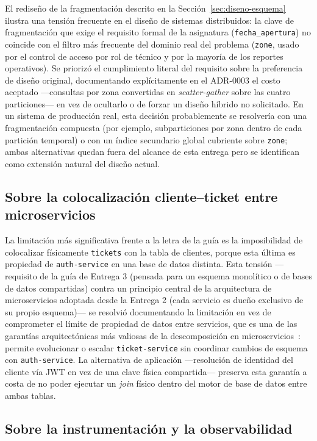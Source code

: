 \documentclass[11pt,letterpaper]{article}
\begin{document}
El rediseño de la fragmentación descrito en la Sección~\ref{sec:diseno-esquema} ilustra una tensión
frecuente en el diseño de sistemas distribuidos: la clave de fragmentación que exige el requisito
formal de la asignatura (\texttt{fecha\_apertura}) no coincide con el filtro más frecuente del
dominio real del problema (\texttt{zone}, usado por el control de acceso por rol de técnico y por
la mayoría de los reportes operativos). Se priorizó el cumplimiento literal del requisito sobre la
preferencia de diseño original, documentando explícitamente en el ADR-0003 el costo aceptado
—consultas por zona convertidas en \emph{scatter-gather} sobre las cuatro particiones— en vez de
ocultarlo o de forzar un diseño híbrido no solicitado. En un sistema de producción real, esta
decisión probablemente se resolvería con una fragmentación compuesta (por ejemplo, subparticiones
por zona dentro de cada partición temporal) o con un índice secundario global cubriente sobre
\texttt{zone}; ambas alternativas quedan fuera del alcance de esta entrega pero se identifican como
extensión natural del diseño actual.

\subsection{Sobre la colocalización cliente–ticket entre microservicios}

La limitación más significativa frente a la letra de la guía es la imposibilidad de colocalizar
físicamente \texttt{tickets} con la tabla de clientes, porque esta última es propiedad de
\texttt{auth-service} en una base de datos distinta. Esta tensión —requisito de la guía de
Entrega 3 (pensada para un esquema monolítico o de bases de datos compartidas) contra un principio
central de la arquitectura de microservicios adoptada desde la Entrega 2 (cada servicio es dueño
exclusivo de su propio esquema)— se resolvió documentando la limitación en vez de comprometer el
límite de propiedad de datos entre servicios, que es una de las garantías arquitectónicas más
valiosas de la descomposición en microservicios~\cite{newman2021microservices}: permite evolucionar
o escalar \texttt{ticket-service} sin coordinar cambios de esquema con \texttt{auth-service}. La
alternativa de aplicación —resolución de identidad del cliente vía JWT en vez de una clave física
compartida— preserva esta garantía a costa de no poder ejecutar un \emph{join} físico dentro del
motor de base de datos entre ambas tablas.

\subsection{Sobre la instrumentación y la observabilidad}
\end{document}
